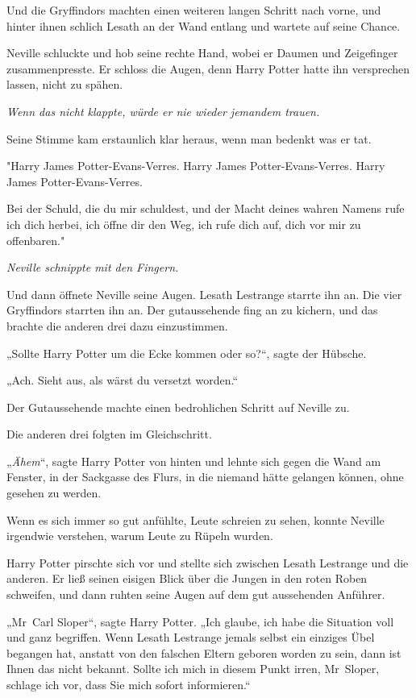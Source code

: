 {Und die Gryffindors machten einen weiteren langen Schritt nach vorne, und hinter ihnen schlich Lesath an der Wand entlang und wartete auf seine Chance.

Neville schluckte und hob seine rechte Hand, wobei er Daumen und Zeigefinger zusammenpresste. Er schloss die Augen, denn Harry Potter hatte ihn versprechen lassen, nicht zu spähen.

\emph{Wenn das nicht klappte, würde er nie wieder jemandem trauen.}

Seine Stimme kam erstaunlich klar heraus, wenn man bedenkt was er tat.

"Harry James Potter-Evans-Verres. Harry James Potter-Evans-Verres. Harry James Potter-Evans-Verres.

Bei der Schuld, die du mir schuldest, und der Macht deines wahren Namens rufe ich dich herbei, ich öffne dir den Weg, ich rufe dich auf, dich vor mir zu offenbaren."

\emph{Neville schnippte mit den Fingern.}

Und dann öffnete Neville seine Augen. Lesath Lestrange starrte ihn an. Die vier Gryffindors starrten ihn an. Der gutaussehende fing an zu kichern, und das brachte die anderen drei dazu einzustimmen.

„Sollte Harry Potter um die Ecke kommen oder so?“, sagte der Hübsche.

„Ach. Sieht aus, als wärst du versetzt worden.“

Der Gutaussehende machte einen bedrohlichen Schritt auf Neville zu.

Die anderen drei folgten im Gleichschritt.

„\emph{Ähem}“, sagte Harry Potter von hinten und lehnte sich gegen die Wand am Fenster, in der Sackgasse des Flurs, in die niemand hätte gelangen können, ohne gesehen zu werden.

Wenn es sich immer so gut anfühlte, Leute schreien zu sehen, konnte Neville irgendwie verstehen, warum Leute zu Rüpeln wurden.

Harry Potter pirschte sich vor und stellte sich zwischen Lesath Lestrange und die anderen. Er ließ seinen eisigen Blick über die Jungen in den roten Roben schweifen, und dann ruhten seine Augen auf dem gut aussehenden Anführer.

„Mr~Carl Sloper“, sagte Harry Potter. „Ich glaube, ich habe die Situation voll und ganz begriffen. Wenn Lesath Lestrange jemals selbst ein einziges Übel begangen hat, anstatt von den falschen Eltern geboren worden zu sein, dann ist Ihnen das nicht bekannt. Sollte ich mich in diesem Punkt irren, Mr~Sloper, schlage ich vor, dass Sie mich sofort informieren.“

}

